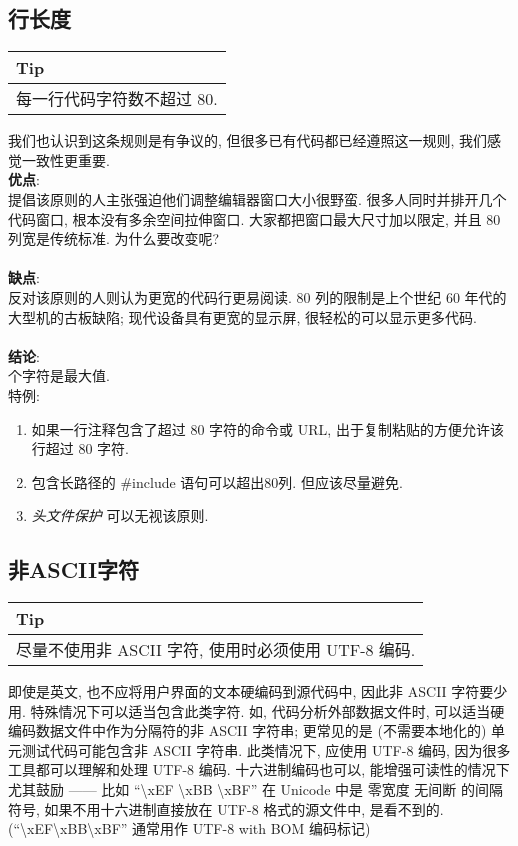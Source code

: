\documentclass[a4paper,11pt,CJK]{article}
\begin{document}
\begin{CJK}{UTF8}{gbsn}
\subsection{行长度}
\begin{table}[htbp]
\flushleft
\begin{tabular}{p{400pt}}
\toprule
\rowcolor[gray]{.8} Tip \\
\midrule
每一行代码字符数不超过 80.\\
\bottomrule
\end{tabular}
\end{table}
我们也认识到这条规则是有争议的, 但很多已有代码都已经遵照这一规则, 我们感觉一致性更重要.\\
\textbf{优点}:\\
\indent 提倡该原则的人主张强迫他们调整编辑器窗口大小很野蛮. 很多人同时并排开几个代码窗口, 根本没有多余空间拉伸窗口. 大家都把窗口最大尺寸加以限定, 并且 80 列宽是传统标准. 为什么要改变呢?\\
\\
\textbf{缺点}:\\
\indent 反对该原则的人则认为更宽的代码行更易阅读. 80 列的限制是上个世纪 60 年代的大型机的古板缺陷; 现代设备具有更宽的显示屏, 很轻松的可以显示更多代码.\\
\\
\textbf{结论}:\\
 个字符是最大值.\\
\indent 特例:
\begin{enumerate}
\item
如果一行注释包含了超过 80 字符的命令或 URL, 出于复制粘贴的方便允许该行超过 80 字符.
\item
包含长路径的 \#include 语句可以超出80列. 但应该尽量避免.
\item
\emph{头文件保护} 可以无视该原则.
\end{enumerate}

\subsection{非ASCII字符}
\begin{table}[htbp]
\flushleft
\begin{tabular}{p{400pt}}
\toprule
\rowcolor[gray]{.8} Tip \\
\midrule
尽量不使用非 ASCII 字符, 使用时必须使用 UTF-8 编码.\\
\bottomrule
\end{tabular}
\end{table}
即使是英文, 也不应将用户界面的文本硬编码到源代码中, 因此非 ASCII 字符要少用. 特殊情况下可以适当包含此类字符. 如, 代码分析外部数据文件时, 可以适当硬编码数据文件中作为分隔符的非 ASCII 字符串; 更常见的是 (不需要本地化的) 单元测试代码可能包含非 ASCII 字符串. 此类情况下, 应使用 UTF-8 编码, 因为很多工具都可以理解和处理 UTF-8 编码. 十六进制编码也可以, 能增强可读性的情况下尤其鼓励 —— 比如 ``\textbackslash xEF \textbackslash xBB \textbackslash xBF'' 在 Unicode 中是 零宽度 无间断 的间隔符号, 如果不用十六进制直接放在 UTF-8 格式的源文件中, 是看不到的. (``\textbackslash xEF\textbackslash xBB\textbackslash xBF'' 通常用作 UTF-8 with BOM 编码标记)\\

\end{CJK}
\end{document}
